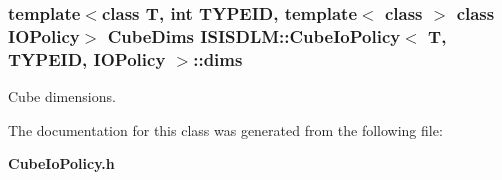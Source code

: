 \subsubsection{\setlength{\rightskip}{0pt plus 5cm}template$<$class T, int TYPEID, template$<$ class $>$ class IOPolicy$>$ {\bf Cube\-Dims} {\bf ISISDLM::Cube\-Io\-Policy}$<$ T, TYPEID, IOPolicy $>$::{\bf dims}\hspace{0.3cm}{\tt  [private]}}\label{classISISDLM_1_1CubeIoPolicy_r0}


Cube dimensions. 



The documentation for this class was generated from the following file:\begin{CompactItemize}
\item 
{\bf Cube\-Io\-Policy.h}\end{CompactItemize}
